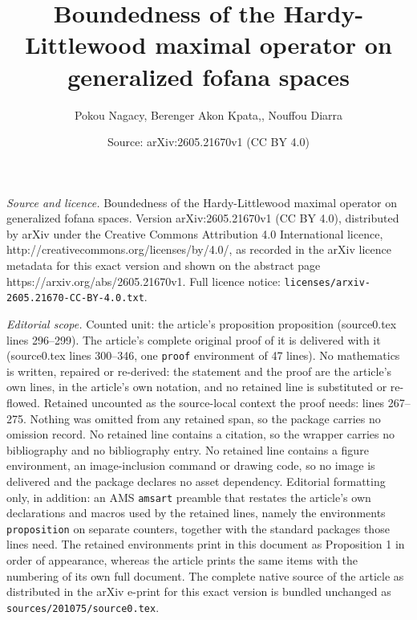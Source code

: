 \documentclass[10pt,a4paper]{amsart}
\title{Boundedness of the Hardy-Littlewood maximal operator on generalized fofana spaces}
\author{Pokou Nagacy, Berenger Akon Kpata,, Nouffou Diarra}
\date{Source: arXiv:2605.21670v1 (CC BY 4.0)}
\begin{document}
\maketitle

\noindent\emph{Source and licence.} Boundedness of the Hardy-Littlewood maximal operator on generalized fofana spaces. Version arXiv:2605.21670v1 (CC BY 4.0), distributed by arXiv under the Creative Commons Attribution 4.0 International licence, http://creativecommons.org/licenses/by/4.0/, as recorded in the arXiv licence metadata for this exact version and shown on the abstract page https://arxiv.org/abs/2605.21670v1. Full licence notice: \texttt{licenses/arxiv-2605.21670-CC-BY-4.0.txt}.\par\smallskip

\noindent\textit{Editorial scope.} Counted unit: the article's proposition proposition (source0.tex lines 296--299). The article's complete original proof of it is delivered with it (source0.tex lines 300--346, one \texttt{proof} environment of 47 lines). No mathematics is written, repaired or re-derived: the statement and the proof are the article's own lines, in the article's own notation, and no retained line is substituted or re-flowed.  Retained uncounted as the source-local context the proof needs: lines 267--275.  Nothing was omitted from any retained span, so the package carries no omission record.  No retained line contains a citation, so the wrapper carries no bibliography and no bibliography entry.  No retained line contains a figure environment, an image-inclusion command or drawing code, so no image is delivered and the package declares no asset dependency.  Editorial formatting only, in addition: an AMS \texttt{amsart} preamble that restates the article's own declarations and macros used by the retained lines, namely the environments \texttt{proposition} on separate counters, together with the standard packages those lines need.  The retained environments print in this document as Proposition 1 in order of appearance, whereas the article prints the same items with the numbering of its own full document.  The complete native source of the article as distributed in the arXiv e-print for this exact version is bundled unchanged as \texttt{sources/201075/source0.tex}.
\end{document}
